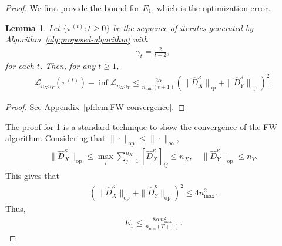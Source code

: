 \documentclass{article}
\newtheorem{lemma}{Lemma}
\begin{document}
\begin{proof}
	We first provide the bound for $E_1$, which is the optimization error.
	
	\begin{lemma}
		\label{lem:FW-convergence}
		Let $\{\pi^{(t)}: t \geq 0\}$ be the sequence of iterates generated by Algorithm~\ref{alg:proposed-algorithm} with
		\begin{align*}
			\gamma_t = \frac{2}{t+2} ,
		\end{align*}
		for each $t$. Then, for any $t \geq 1$,
		\begin{align*}
			\mathcal{L}_{n_Xn_Y}(\pi^{(t)}) - \inf\mathcal{L}_{n_Xn_Y} \leq \frac{2\alpha}{n_{\min}(t+1)} \left(\|\hat{D}_X^\kappa\|_{\mathrm{op}} + \|\hat{D}_Y^\kappa\|_{\mathrm{op}}\right)^2 .
		\end{align*}
	\end{lemma}
	\begin{proof}
		See Appendix~\ref{pf:lem:FW-convergence}.
	\end{proof}
	
	The proof for \cref{lem:FW-convergence} is a standard technique to show the convergence of the FW algorithm. Considering that $\|\cdot\|_{\mathrm{op}} \leq \|\cdot\|_{\infty}$,
	\begin{align*}
		\|\hat{D}_X^\kappa\|_{\mathrm{op}} \leq \max_{i} \sum_{j=1}^{n_X} [\hat{D}_X^\kappa]_{ij} \leq n_X , \quad \|\hat{D}_Y^\kappa\|_{\mathrm{op}} \leq n_Y .
	\end{align*}
	This gives that
	\begin{align*}
		\left(\|\hat{D}_X^\kappa\|_{\mathrm{op}} + \|\hat{D}_Y^\kappa\|_{\mathrm{op}}\right)^2 \leq 4n_{\max}^2 .
	\end{align*}
	Thus,
	\begin{align*}
		E_1 \leq \frac{8\alpha \, n_{\max}^2}{n_{\min}(T+1)} .
	\end{align*}
	

\end{proof}
\end{document}
